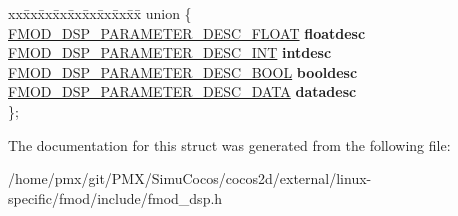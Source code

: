 \begin{DoxyCompactItemize}
\begin{tabbing}
\end{tabbing}\item 
\mbox{\label{structFMOD__DSP__PARAMETER__DESC_a84d611bb616727255a17da54279c18bd}} 
\begin{tabbing}
xx\=xx\=xx\=xx\=xx\=xx\=xx\=xx\=xx\=\kill
union \{\\
\>\hyperlink{structFMOD__DSP__PARAMETER__DESC__FLOAT}{FMOD\_DSP\_PARAMETER\_DESC\_FLOAT} {\bfseries floatdesc}\\
\>\hyperlink{structFMOD__DSP__PARAMETER__DESC__INT}{FMOD\_DSP\_PARAMETER\_DESC\_INT} {\bfseries intdesc}\\
\>\hyperlink{structFMOD__DSP__PARAMETER__DESC__BOOL}{FMOD\_DSP\_PARAMETER\_DESC\_BOOL} {\bfseries booldesc}\\
\>\hyperlink{structFMOD__DSP__PARAMETER__DESC__DATA}{FMOD\_DSP\_PARAMETER\_DESC\_DATA} {\bfseries datadesc}\\
\}; \\

\end{tabbing}\end{DoxyCompactItemize}


The documentation for this struct was generated from the following file\+:\begin{DoxyCompactItemize}
\item 
/home/pmx/git/\+P\+M\+X/\+Simu\+Cocos/cocos2d/external/linux-\/specific/fmod/include/fmod\+\_\+dsp.\+h\end{DoxyCompactItemize}
